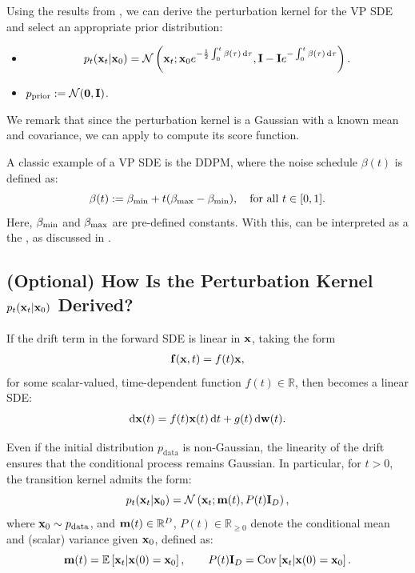 Using the results from , we can derive the perturbation kernel for the VP SDE and select an appropriate prior distribution:
\begin{itemize}
    \item {}
    \[
    p_t({\mathbf{x}}_t|{\mathbf{x}}_0) = \mathcal{N}\left({\mathbf{x}}_t ; {\mathbf{x}}_0 e^{-\frac{1}{2}\int_{0}^{t} \beta(\tau)\mathop{}\!\mathrm{d} \tau}, {\mathbf{I}} - {\mathbf{I}} e^{-\int_{0}^{t} \beta(\tau)\mathop{}\!\mathrm{d} \tau}\right).
    \]
    \item {} $p_{\mathrm{prior}} := \mathcal{N}(\bm{0}, {\mathbf{I}})$.
\end{itemize}
We remark that since the perturbation kernel is a Gaussian with a known mean and covariance, we can apply  to compute its score function.

A classic example of a VP SDE is the DDPM, where the noise schedule $\beta(t)$ is defined as:
\[
\beta(t) := \beta_{\textup{min}} + t(\beta_{\textup{max}} - \beta_{\textup{min}}), \quad \text{for all } t \in [0,1].
\]
Here, $\beta_{\textup{min}}$ and $\beta_{\textup{max}}$ are pre-defined constants. With this,  can be interpreted as a  the , as discussed in .






\subsection{(Optional) How Is the Perturbation Kernel 
$ p_t({\mathbf{x}}_t|{\mathbf{x}}_0) $ Derived?}\label{subsec:scoresde-perturbation-kernel}
If the drift term in the forward SDE  is linear in ${\mathbf{x}}$, taking the form
\begin{align*}
    {\mathbf{f}}({\mathbf{x}}, t) = f(t) {\mathbf{x}},
\end{align*}
for some scalar-valued, time-dependent function $f(t) \in \mathbb{R}$, then  becomes a linear SDE:
\[
\mathop{}\!\mathrm{d}{\mathbf{x}}(t) = f(t){\mathbf{x}}(t) \mathop{}\!\mathrm{d} t + g(t) \mathop{}\!\mathrm{d}{\mathbf{w}}(t).
\]


Even if the initial distribution $p_{\mathrm{data}}$ is non-Gaussian, the linearity of the drift ensures that the conditional process remains Gaussian. In particular, for $t>0$, the transition kernel admits the form:
\[
p_t( {\mathbf{x}}_t | {\mathbf{x}}_0 ) = \mathcal{N} \left( {\mathbf{x}}_t;  {\mathbf{m}}(t),  P(t) \mathbf{I}_D \right),
\]
where ${\mathbf{x}}_0 \sim p_{\mathrm{data}}$, and ${\mathbf{m}}(t) \in \mathbb{R}^D$, $P(t)\in\mathbb{R}_{\ge 0}$ denote the conditional mean and (scalar) variance given ${\mathbf{x}}_0$, defined as:
\[
{\mathbf{m}}(t) = \mathbb{E} \left[{\mathbf{x}}_t | {\mathbf{x}}(0) = {\mathbf{x}}_0\right], \qquad
P(t) \mathbf{I}_D = \operatorname{Cov} \left[{\mathbf{x}}_t | {\mathbf{x}}(0) = {\mathbf{x}}_0\right].
\]

